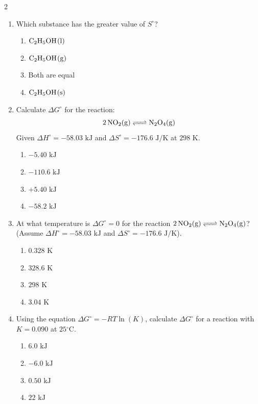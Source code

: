 \documentclass[12pt,letterpaper]{article}
\begin{document}
\begin{multicols*}{2}
\begin{enumerate}
        \item Which substance has the greater value of $S^\circ$? %
            \begin{enumerate}
                \item $\ce{C2H5OH(l)}$
                \item $\ce{C2H5OH(g)}$
                \item Both are equal
                \item $\ce{C2H5OH(s)}$
            \end{enumerate}
        \columnbreak
        \item Calculate $\Delta G^\circ$ for the reaction:
            \begin{equation*}
                \ce{2NO2(g) <=> N2O4(g)}
            \end{equation*}
            Given $\Delta H^\circ = -58.03\text{ kJ}$ and $\Delta S^\circ = -176.6\text{ J/K}$ at $298\text{ K}$. %
            \begin{enumerate}
                \item $-5.40\text{ kJ}$
                \item $-110.6\text{ kJ}$
                \item $+5.40\text{ kJ}$
                \item $-58.2\text{ kJ}$
            \end{enumerate}

        \item At what temperature is $\Delta G^\circ = 0$ for the reaction $\ce{2NO2(g) <=> N2O4(g)}$? (Assume $\Delta H^\circ = -58.03\text{ kJ}$ and $\Delta S^\circ = -176.6\text{ J/K}$). %
            \begin{enumerate}
                \item $0.328\text{ K}$
                \item $328.6\text{ K}$
                \item $298\text{ K}$
                \item $3.04\text{ K}$
            \end{enumerate}
        \item Using the equation $\Delta G^\circ = -RT\ln(K)$, calculate $\Delta G^\circ$ for a reaction with $K = 0.090$ at $25\text{}^\circ\text{C}$. %
            \begin{enumerate}
                \item $6.0\text{ kJ}$
                \item $-6.0\text{ kJ}$
                \item $0.50\text{ kJ}$
                \item $22\text{ kJ}$
            \end{enumerate}


\end{enumerate}
\end{multicols*}
\end{document}

